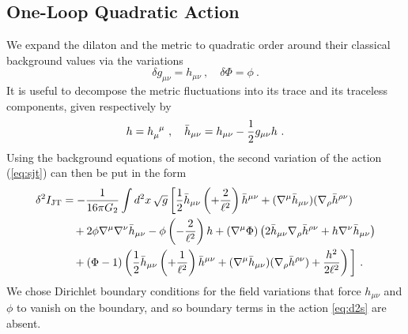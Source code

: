 \documentclass[12pt]{article}
\newcommand{\ind}[1]{\indices{#1}}
\begin{document}
\subsection{One-Loop Quadratic Action}
\label{sec:quadact}

We expand the dilaton and the metric to quadratic order around their classical background values via the variations
\begin{equation}
	\delta g_{\mu\nu} = h_{\mu\nu}~, \quad \delta \Phi = \phi~.
\end{equation}
It is useful to decompose the metric fluctuations into its trace and its traceless components, given respectively by
\begin{equation}
	h = h\ind{_\mu^\mu}~, \quad \bar{h}_{\mu\nu} = h_{\mu\nu} - \frac{1}{2}g_{\mu\nu} h~.
\end{equation}
Using the background equations of motion, the second variation of the action (\ref{eq:sjt}) can then be put in the form
\begin{equation}\begin{aligned}
	\delta^2 I_\text{JT} &= -\frac{1}{16\pi G_2}\int d^2x\,\sqrt{g}\,\bigg{[} \frac{1}{2}\bar{h}_{\mu\nu}\left(\square+\frac{2}{\ell^2}\right) \bar{h}^{\mu\nu} + (\nabla^\mu \bar{h}_{\mu\nu})(\nabla_\rho \bar{h}^{\rho\nu})  \\
	&\quad + 2 \phi \nabla^\mu \nabla^\nu \bar{h}_{\mu\nu}- \phi \left(\square-\frac{2}{\ell^2}\right) h + (\nabla^\mu \Phi)\left(2 \bar{h}_{\mu\nu}\nabla_\rho \bar{h}^{\rho\nu} + h \nabla^\nu \bar{h}_{\mu\nu}\right) \\
	&\quad + (\Phi - 1)\left(\frac{1}{2}\bar{h}_{\mu\nu}\left(\square+\frac{1}{\ell^2}\right) \bar{h}^{\mu\nu} + (\nabla^\mu \bar{h}_{\mu\nu})(\nabla_\rho \bar{h}^{\rho\nu}) + \frac{h^2}{2\ell^2}\right) \bigg{]}~.
\label{eq:d2s}
\end{aligned}\end{equation}
%
We chose Dirichlet boundary conditions for the field variations that force $h_{\mu\nu}$ and $\phi$ to vanish on the boundary, and so boundary terms in the action \eqref{eq:d2s} are absent. 
\end{document}
